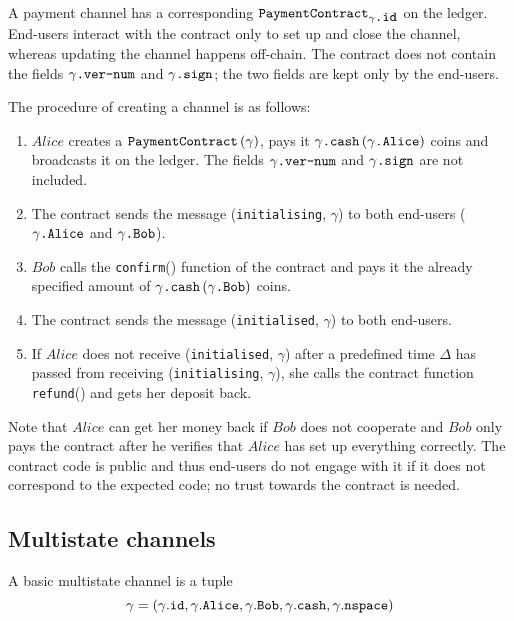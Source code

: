     A payment channel has a corresponding
    $\mbox{\texttt{PaymentContract}}_{\gamma\mbox{\texttt{.id}}}$ on the ledger. End-users
    interact with the contract only to set up and close the channel, whereas updating the
    channel happens off-chain. The contract does not contain the fields
    $\gamma\mbox{\texttt{.ver-num}}$ and $\gamma\mbox{\texttt{.sign}}$; the two fields are
    kept only by the end-users.

    The procedure of creating a channel is as follows:
    \begin{enumerate}
      \item $Alice$ creates a $\mbox{\texttt{PaymentContract}}\left(\gamma\right)$, pays
      it $\gamma\mbox{\texttt{.cash}}\left(\gamma\mbox{\texttt{.Alice}}\right)$ coins and
      broadcasts it on the ledger. The fields $\gamma\mbox{\texttt{.ver-num}}$ and
      $\gamma\mbox{\texttt{.sign}}$ are not included.
      \item The contract sends the message (\texttt{initialising}, $\gamma$) to both
      end-users ($\gamma\mbox{\texttt{.Alice}}$ and $\gamma\mbox{\texttt{.Bob}}$).
      \item $Bob$ calls the \texttt{confirm}() function of the contract and pays it the
      already specified amount of
      $\gamma\mbox{\texttt{.cash}}\left(\gamma\mbox{\texttt{.Bob}}\right)$ coins.
      \item The contract sends the message (\texttt{initialised}, $\gamma$) to both
      end-users.
      \item If $Alice$ does not receive (\texttt{initialised}, $\gamma$) after a
      predefined time $\Delta$ has passed from receiving (\texttt{initialising},
      $\gamma$), she calls the contract function \texttt{refund}() and gets her deposit
      back.
    \end{enumerate}

    Note that $Alice$ can get her money back if $Bob$ does not cooperate and $Bob$ only
    pays the contract after he verifies that $Alice$ has set up everything correctly. The
    contract code is public and thus end-users do not engage with it if it does not
    correspond to the expected code; no trust towards the contract is needed.

  \subsection{Multistate channels}
    A basic multistate channel is a tuple
    \begin{equation*}
      \gamma = \left(\gamma\mbox{.\texttt{id}}, \gamma\mbox{.\texttt{Alice}},
      \gamma\mbox{.\texttt{Bob}}, \gamma\mbox{.\texttt{cash}},
      \gamma\mbox{.\texttt{nspace}}\right)
    \end{equation*}
